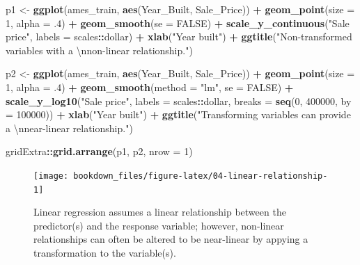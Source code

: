 \documentclass[]{krantz}
\makeatletter
\newenvironment{Shaded}{\begin{snugshade}}{\end{snugshade}}
\newcommand{\CharTok}[1]{\textcolor[rgb]{0.5,0.5,0.5}{#1}}
\newcommand{\DataTypeTok}[1]{\textcolor[rgb]{0.27,0.27,0.27}{#1}}
\newcommand{\DecValTok}[1]{\textcolor[rgb]{0.06,0.06,0.06}{#1}}
\newcommand{\FloatTok}[1]{\textcolor[rgb]{0.06,0.06,0.06}{#1}}
\newcommand{\KeywordTok}[1]{\textcolor[rgb]{0.27,0.27,0.27}{\textbf{#1}}}
\newcommand{\NormalTok}[1]{#1}
\newcommand{\OperatorTok}[1]{\textcolor[rgb]{0.43,0.43,0.43}{\textbf{#1}}}
\newcommand{\OtherTok}[1]{\textcolor[rgb]{0.37,0.37,0.37}{#1}}
\newcommand{\StringTok}[1]{\textcolor[rgb]{0.5,0.5,0.5}{#1}}
\newenvironment{kframe}{%
\medskip{}
\setlength{\fboxsep}{.8em}
 \def\at@end@of@kframe{}%
 \ifinner\ifhmode%
  \def\at@end@of@kframe{\end{minipage}}%
  \begin{minipage}{\columnwidth}%
 \fi\fi%
 \def\FrameCommand##1{\hskip\@totalleftmargin \hskip-\fboxsep
 \colorbox{shadecolor}{##1}\hskip-\fboxsep
     \hskip-\linewidth \hskip-\@totalleftmargin \hskip\columnwidth}%
 \MakeFramed {\advance\hsize-\width
   \@totalleftmargin\z@ \linewidth\hsize
   \@setminipage}}%
 {\par\unskip\endMakeFramed%
 \at@end@of@kframe}
\renewenvironment{Shaded}{\begin{kframe}}{\end{kframe}}
\makeatother
\begin{document}
\begin{Shaded}
\begin{Highlighting}[]
\NormalTok{p1 <-}\StringTok{ }\KeywordTok{ggplot}\NormalTok{(ames_train, }\KeywordTok{aes}\NormalTok{(Year_Built, Sale_Price)) }\OperatorTok{+}\StringTok{ }
\StringTok{  }\KeywordTok{geom_point}\NormalTok{(}\DataTypeTok{size =} \DecValTok{1}\NormalTok{, }\DataTypeTok{alpha =} \FloatTok{.4}\NormalTok{) }\OperatorTok{+}
\StringTok{  }\KeywordTok{geom_smooth}\NormalTok{(}\DataTypeTok{se =} \OtherTok{FALSE}\NormalTok{) }\OperatorTok{+}
\StringTok{  }\KeywordTok{scale_y_continuous}\NormalTok{(}\StringTok{"Sale price"}\NormalTok{, }\DataTypeTok{labels =}\NormalTok{ scales}\OperatorTok{::}\NormalTok{dollar) }\OperatorTok{+}
\StringTok{  }\KeywordTok{xlab}\NormalTok{(}\StringTok{"Year built"}\NormalTok{) }\OperatorTok{+}
\StringTok{  }\KeywordTok{ggtitle}\NormalTok{(}\StringTok{"Non-transformed variables with a }\CharTok{\textbackslash{}n}\StringTok{non-linear relationship."}\NormalTok{)}

\NormalTok{p2 <-}\StringTok{ }\KeywordTok{ggplot}\NormalTok{(ames_train, }\KeywordTok{aes}\NormalTok{(Year_Built, Sale_Price)) }\OperatorTok{+}\StringTok{ }
\StringTok{  }\KeywordTok{geom_point}\NormalTok{(}\DataTypeTok{size =} \DecValTok{1}\NormalTok{, }\DataTypeTok{alpha =} \FloatTok{.4}\NormalTok{) }\OperatorTok{+}\StringTok{ }
\StringTok{  }\KeywordTok{geom_smooth}\NormalTok{(}\DataTypeTok{method =} \StringTok{"lm"}\NormalTok{, }\DataTypeTok{se =} \OtherTok{FALSE}\NormalTok{) }\OperatorTok{+}
\StringTok{  }\KeywordTok{scale_y_log10}\NormalTok{(}\StringTok{"Sale price"}\NormalTok{, }\DataTypeTok{labels =}\NormalTok{ scales}\OperatorTok{::}\NormalTok{dollar, }
                \DataTypeTok{breaks =} \KeywordTok{seq}\NormalTok{(}\DecValTok{0}\NormalTok{, }\DecValTok{400000}\NormalTok{, }\DataTypeTok{by =} \DecValTok{100000}\NormalTok{)) }\OperatorTok{+}
\StringTok{  }\KeywordTok{xlab}\NormalTok{(}\StringTok{"Year built"}\NormalTok{) }\OperatorTok{+}
\StringTok{  }\KeywordTok{ggtitle}\NormalTok{(}\StringTok{"Transforming variables can provide a }\CharTok{\textbackslash{}n}\StringTok{near-linear relationship."}\NormalTok{)}

\NormalTok{gridExtra}\OperatorTok{::}\KeywordTok{grid.arrange}\NormalTok{(p1, p2, }\DataTypeTok{nrow =} \DecValTok{1}\NormalTok{)}
\end{Highlighting}
\end{Shaded}

\begin{figure}

{\centering \texttt{[image: bookdown\_files/figure-latex/04-linear-relationship-1]} 

}

\caption{Linear regression assumes a linear relationship between the predictor(s) and the response variable; however, non-linear relationships can often be altered to be near-linear by appying a transformation to the variable(s).}\label{fig:04-linear-relationship}
\end{figure}
\end{document}
